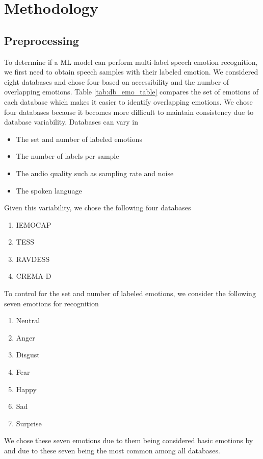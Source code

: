 \documentclass[conference]{IEEEtran}
\begin{document}
\section{Methodology}

\subsection{Preprocessing}

To determine if a ML model can perform multi-label speech emotion recognition, we first need to obtain speech samples with their labeled emotion. We considered eight databases and chose four based on accessibility and the number of overlapping emotions. Table \ref{tab:db_emo_table} compares the set of emotions of each database which makes it easier to identify overlapping emotions. We chose four databases because it becomes more difficult to maintain consistency due to database variability. Databases can vary in
\begin{itemize}
	\item The set and number of labeled emotions
	\item The number of labels per sample
	\item The audio quality such as sampling rate and noise
	\item The spoken language
\end{itemize}
Given this variability, we chose the following four databases
\begin{enumerate}
	\item IEMOCAP \cite{busso_2008}
	\item TESS \cite{dupuis_2011}
	\item RAVDESS \cite{livingstone_2018}
	\item CREMA-D \cite{cao_2014}
\end{enumerate}

To control for the set and number of labeled emotions, we consider the following seven emotions for recognition
\begin{enumerate}
	\item Neutral
	\item Anger
	\item Disgust
	\item Fear
	\item Happy
	\item Sad
	\item Surprise
\end{enumerate}
We chose these seven emotions due to them being considered basic emotions by \cite{Ekman1992} and due to these seven being the most common among all databases. 
\end{document}
